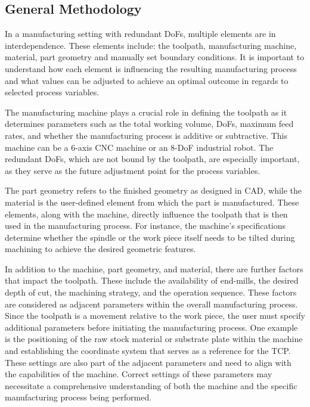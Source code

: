 \documentclass[conference]{IEEEtran}
\begin{document}
\subsection{General Methodology}

In a manufacturing setting with redundant DoFs, multiple elements are in interdependence. These elements include: the toolpath, manufacturing machine, material, part geometry and manually set boundary conditions. It is important to understand how each element is influencing the resulting manufacturing process and what values can be adjusted to achieve an optimal outcome in regards to selected process variables.

The manufacturing machine plays a crucial role in defining the toolpath as it determines parameters such as the total working volume, DoFs, maximum feed rates, and whether the manufacturing process is additive or subtractive. This machine can be a 6-axis CNC machine or an 8-DoF industrial robot. The redundant DoFs, which are not bound by the toolpath, are especially important, as they serve as the future adjustment point for the process variables.

The part geometry refers to the finished geometry as designed in CAD, while the material is the user-defined element from which the part is manufactured. These elements, along with the machine, directly influence the toolpath that is then used in the manufacturing process. For instance, the machine's specifications determine whether the spindle or the work piece itself needs to be tilted during machining to achieve the desired geometric features.

In addition to the machine, part geometry, and material, there are further factors that impact the toolpath. These include the availability of end-mills, the desired depth of cut, the machining strategy, and the operation sequence. These factors are considered as adjacent parameters within the overall manufacturing process. Since the toolpath is a movement relative to the work piece, the user must specify additional parameters before initiating the manufacturing process. One example is the positioning of the raw stock material or substrate plate within the machine and establishing the coordinate system that serves as a reference for the TCP. These settings are also part of the adjacent parameters and need to align with the capabilities of the machine. Correct settings of these parameters may necessitate a comprehensive understanding of both the machine and the specific manufacturing process being performed.
\end{document}
